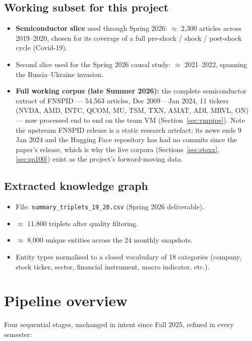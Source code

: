 \documentclass[11pt]{article}
\begin{document}
\subsection{Working subset for this project}
\begin{itemize}
  \item \textbf{Semiconductor slice} used through Spring 2026: \(\approx\) 2{,}300 articles across 2019--2020, chosen for its coverage of a full pre-shock / shock / post-shock cycle (Covid-19).
  \item Second slice used for the Spring 2026 causal study: \(\approx\) 2021--2022, spanning the Russia--Ukraine invasion.
  \item \textbf{Full working corpus (late Summer 2026):} the complete semiconductor extract of FNSPID --- 54{,}563 articles, Dec 2009 -- Jan 2024, 11 tickers (NVDA, AMD, INTC, QCOM, MU, TSM, TXN, AMAT, ADI, MRVL, ON) --- now processed end to end on the team VM (Section~\ref{sec:vmpipe}). Note the upstream FNSPID release is a static research artefact: its news ends 9 Jan 2024 and the Hugging Face repository has had no commits since the paper's release, which is why the live corpora (Sections~\ref{sec:stoxx}, \ref{sec:sp100}) exist as the project's forward-moving data.
\end{itemize}

\subsection{Extracted knowledge graph}
\begin{itemize}
  \item File: \texttt{summary\_triplets\_19\_20.csv} (Spring 2026 deliverable).
  \item \(\approx\) 11{,}800 triplets after quality filtering.
  \item \(\approx\) 8{,}000 unique entities across the 24 monthly snapshots.
  \item Entity types normalised to a closed vocabulary of 18 categories (company, stock ticker, sector, financial instrument, macro indicator, etc.).
\end{itemize}

\section{Pipeline overview}
\label{sec:pipeline}

Four sequential stages, unchanged in intent since Fall 2025, refined in every semester:
\end{document}
